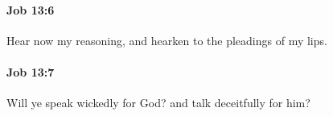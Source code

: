 		\paragraph{Job 13:6} %
			\label{JOB-13-6}

			Hear now my reasoning, and hearken to the pleadings of my lips.


		\paragraph{Job 13:7} %
			\label{JOB-13-7}

			Will ye speak wickedly for God? and talk deceitfully for him?


